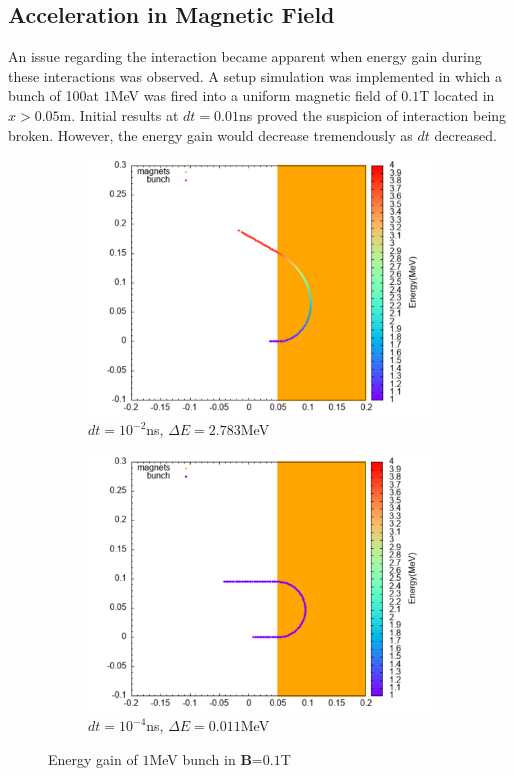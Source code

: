\documentclass{book}
\begin{document}
\subsection{Acceleration in Magnetic Field}
An issue regarding the \eB interaction became apparent when energy gain during these interactions was observed.
A setup simulation was implemented in which a bunch of 100\e at $1$MeV was fired into a uniform magnetic field of $0.1$T located in $x>0.05$m.
Initial results at $dt=0.01$ns proved the suspicion of \eB interaction being broken. However, the energy gain would decrease tremendously as $dt$ decreased.
\begin{figure}
    \captionsetup[subfigure]{justification=centering}
    \captionsetup{justification=centering}
    \centering
    \begin{subfigure}{0.8\textwidth}
        \centering
        \includegraphics[width=\linewidth]{../../../figures/rhodoSim/mag_lf_001dt.png}
        \caption*{$dt=10^{-2}$ns, $\Delta E=2.783$MeV}
    \end{subfigure}
    \begin{subfigure}{0.8\textwidth}
        \centering
        \includegraphics[width=\linewidth]{../../../figures/rhodoSim/mag_lf_00001dt.png}
        \caption*{$dt=10^{-4}$ns, $\Delta E=0.011$MeV}
    \end{subfigure}
    \caption{Energy gain of $1$MeV bunch in \textbf{B}=$0.1$T}
    \label{fig:mag_lf_render}
\end{figure}
\end{document}
